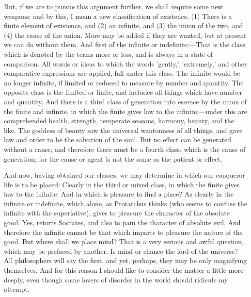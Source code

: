 \documentclass[11pt,letter]{article}
\begin{document}
\par  But, if we are to pursue this argument further, we shall require some new weapons; and by this, I mean a new classification of existence. (1) There is a finite element of existence, and (2) an infinite, and (3) the union of the two, and (4) the cause of the union. More may be added if they are wanted, but at present we can do without them. And first of the infinite or indefinite:—That is the class which is denoted by the terms more or less, and is always in a state of comparison. All words or ideas to which the words 'gently,' 'extremely,' and other comparative expressions are applied, fall under this class. The infinite would be no longer infinite, if limited or reduced to measure by number and quantity. The opposite class is the limited or finite, and includes all things which have number and quantity. And there is a third class of generation into essence by the union of the finite and infinite, in which the finite gives law to the infinite;—under this are comprehended health, strength, temperate seasons, harmony, beauty, and the like. The goddess of beauty saw the universal wantonness of all things, and gave law and order to be the salvation of the soul. But no effect can be generated without a cause, and therefore there must be a fourth class, which is the cause of generation; for the cause or agent is not the same as the patient or effect.

\par  And now, having obtained our classes, we may determine in which our conqueror life is to be placed: Clearly in the third or mixed class, in which the finite gives law to the infinite. And in which is pleasure to find a place? As clearly in the infinite or indefinite, which alone, as Protarchus thinks (who seems to confuse the infinite with the superlative), gives to pleasure the character of the absolute good. Yes, retorts Socrates, and also to pain the character of absolute evil. And therefore the infinite cannot be that which imparts to pleasure the nature of the good. But where shall we place mind? That is a very serious and awful question, which may be prefaced by another. Is mind or chance the lord of the universe? All philosophers will say the first, and yet, perhaps, they may be only magnifying themselves. And for this reason I should like to consider the matter a little more deeply, even though some lovers of disorder in the world should ridicule my attempt.
\end{document}
